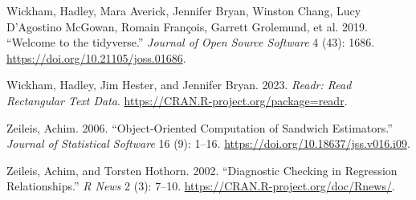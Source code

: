 \documentclass[
]{article}
\newlength{\cslhangindent}
\newlength{\cslentryspacingunit} %
\newenvironment{CSLReferences}[2] %
 {%
  \setlength{\parindent}{0pt}
  \ifodd #1
  \let\oldpar\par
  \def\par{\hangindent=\cslhangindent\oldpar}
  \fi
  \setlength{\parskip}{#2\cslentryspacingunit}
 }%
 {}
\begin{document}
\begin{CSLReferences}{1}{0}
\leavevmode{}%
Wickham, Hadley, Mara Averick, Jennifer Bryan, Winston Chang, Lucy
D'Agostino McGowan, Romain François, Garrett Grolemund, et al. 2019.
{``Welcome to the {tidyverse}.''} \emph{Journal of Open Source Software}
4 (43): 1686. \url{https://doi.org/10.21105/joss.01686}.

\leavevmode{}%
Wickham, Hadley, Jim Hester, and Jennifer Bryan. 2023. \emph{Readr: Read
Rectangular Text Data}. \url{https://CRAN.R-project.org/package=readr}.

\leavevmode{}%
Zeileis, Achim. 2006. {``Object-Oriented Computation of Sandwich
Estimators.''} \emph{Journal of Statistical Software} 16 (9): 1--16.
\url{https://doi.org/10.18637/jss.v016.i09}.

\leavevmode{}%
Zeileis, Achim, and Torsten Hothorn. 2002. {``Diagnostic Checking in
Regression Relationships.''} \emph{R News} 2 (3): 7--10.
\url{https://CRAN.R-project.org/doc/Rnews/}.

\end{CSLReferences}
\end{document}
